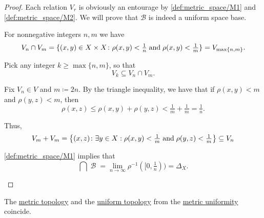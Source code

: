 \begin{proof}
  Each relation \( V_r \) is obviously an entourage by \ref{def:metric_space/M1} and \ref{def:metric_space/M2}. We will prove that \( \mathcal{B} \) is indeed a uniform space base.

  \begin{refenum}
     For nonnegative integers \( n, m \) we have
    \begin{equation*}
      V_n \cap V_m
      =
      \{ (x, y) \in X \times X \colon \rho(x, y) < \tfrac 1 n \T{and} \rho(x, y) < \tfrac 1 m \}
      =
      V_{\max\{ n, m \}}.
    \end{equation*}

    Pick any integer \( k \geq \max\{ n, m \} \), so that
    \begin{equation*}
      V_k \subseteq V_n \cap V_m.
    \end{equation*}

     Fix \( V_n \in V \) and \( m \coloneqq 2n \). By the triangle inequality, we have that if \( \rho(x, y) < m \) and \( \rho(y, z) < m \), then
    \begin{equation*}
      \rho(x, z) \leq \rho(x, y) + \rho(y, z) < \tfrac 1 m + \tfrac 1 m = \tfrac 1 n.
    \end{equation*}

    Thus,
    \begin{equation*}
      V_m + V_m
      =
      \left\{ (x, z) \colon \exists y \in X: \rho(x, y) < \tfrac 1 m \T{and} \rho(y, z) < \tfrac 1 m \right\}
      \subseteq
      V_n
    \end{equation*}

     \ref{def:metric_space/M1} implies that
    \begin{equation*}
      \bigcap \mscrB = \lim_{n \to \infty} \rho^{-1}([0, \tfrac 1 n)) = \Delta_X.
    \end{equation*}
  \end{refenum}
\end{proof}

\begin{proposition}\label{thm:metric_topology_coincides_with_uniform_topology}
  The \hyperref[def:metric_topology]{metric topology} and the \hyperref[def:uniform_topology]{uniform topology} from the \hyperref[def:metric_uniformity]{metric uniformity} coincide.
\end{proposition}

